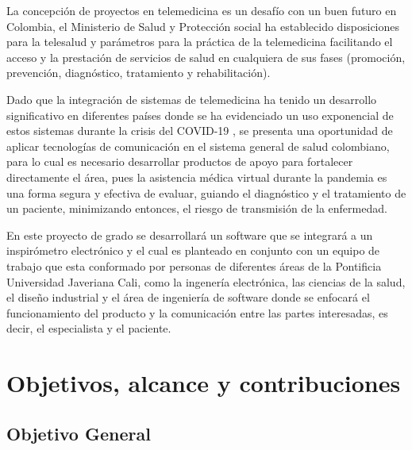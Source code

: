 \documentclass[12pt]{article}
\begin{document}
La concepci\'on de proyectos en telemedicina es un desaf\'io con un buen futuro en Colombia,  el Ministerio de Salud y Protecci\'on social ha establecido disposiciones para la telesalud y par\'ametros para la pr\'actica de la telemedicina facilitando el acceso y la prestaci\'on de servicios de salud en cualquiera de sus fases (promoci\'on, prevenci\'on, diagn\'ostico, tratamiento y rehabilitaci\'on)\cite{8}. 

Dado que la integraci\'on de sistemas de telemedicina ha tenido un desarrollo significativo en diferentes pa\'ises donde se ha evidenciado un uso exponencial de estos sistemas durante la crisis del COVID-19 \cite{10}, se presenta una oportunidad de aplicar tecnolog\'ias de comunicaci\'on en el sistema general de salud colombiano, para lo cual es necesario desarrollar productos de apoyo para fortalecer directamente el \'area, pues la asistencia m\'edica virtual durante la pandemia es una forma segura y efectiva de evaluar, guiando el diagn\'ostico y el tratamiento de un paciente, minimizando entonces, el riesgo de transmisi\'on de la enfermedad.

En este proyecto de grado se desarrollar\'a un software que se integrar\'a a un inspir\'ometro electr\'onico y el cual es planteado en conjunto con un equipo de trabajo que esta conformado por personas de diferentes \'areas de la Pontificia Universidad Javeriana Cali, como la ingener\'ia electr\'onica, las ciencias de la salud, el dise\~{n}o industrial y el \'area de ingenier\'ia de software donde se enfocar\'a el funcionamiento del producto y la comunicaci\'on entre las partes interesadas, es decir, el especialista y el paciente.










\section{Objetivos, alcance y contribuciones}

\subsection*{Objetivo General}
\end{document}
